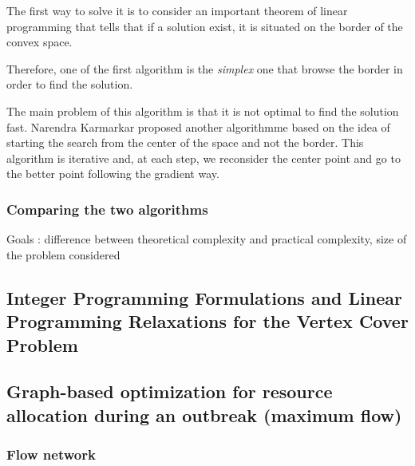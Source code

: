 \documentclass[12pt, openany]{article}
\begin{document}
The first way to solve it is to consider an important theorem of linear programming that tells that if a solution exist, it is situated on the border of the convex space.

Therefore, one of the first algorithm is the \emph{simplex} one that browse the border in order to find the solution.

The main problem of this algorithm is that it is not optimal to find the solution fast. Narendra Karmarkar proposed another algorithmme based on the idea of starting the search from the center of the space and not the border. This algorithm is iterative and, at each step, we reconsider the center point and go to the better point following the gradient way.

\subsubsection{Comparing the two algorithms}

Goals : difference between theoretical complexity and practical complexity, size of the problem considered

\subsection{Integer Programming Formulations and Linear Programming Relaxations for the Vertex Cover Problem}

\subsection{Graph-based optimization for resource allocation during an outbreak (maximum flow)}

\subsubsection{Flow network}
\end{document}
